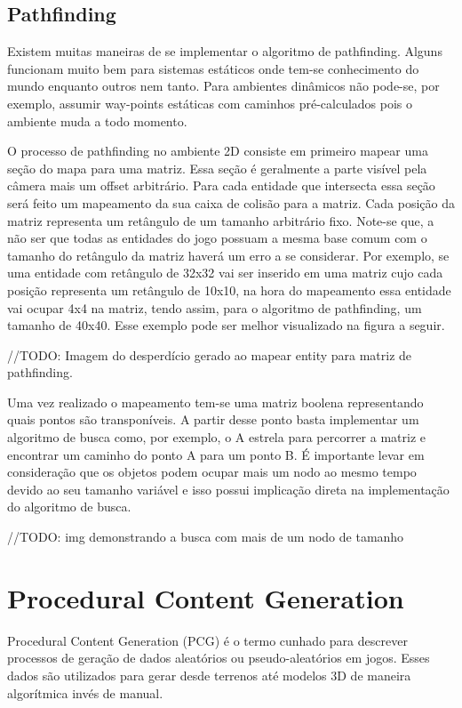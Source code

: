 \documentclass[12pt, 
openright, 
oneside, 
a4paper,    
brazil]{facom-ufu-abntex2}
\begin{document}
\section{Pathfinding}
Existem muitas maneiras de se implementar o algoritmo de pathfinding. Alguns funcionam muito bem para sistemas estáticos onde tem-se conhecimento do mundo enquanto outros nem tanto. Para ambientes dinâmicos não pode-se, por exemplo, assumir way-points estáticas com caminhos pré-calculados pois o ambiente muda a todo momento.

O processo de pathfinding no ambiente 2D consiste em primeiro mapear uma seção do mapa para uma matriz. Essa seção é geralmente a parte visível pela câmera mais um offset arbitrário. Para cada entidade que intersecta essa seção será feito um mapeamento da sua caixa de colisão para a matriz. Cada posição da matriz representa um retângulo de um tamanho arbitrário fixo. Note-se que, a não ser que todas as entidades do jogo possuam a mesma base comum com o tamanho do retângulo da matriz haverá um erro a se considerar. Por exemplo, se uma entidade com retângulo de 32x32 vai ser inserido em uma matriz cujo cada posição representa um retângulo de 10x10, na hora do mapeamento essa entidade vai ocupar 4x4 na matriz, tendo assim, para o algoritmo de pathfinding, um tamanho de 40x40. Esse exemplo pode ser melhor visualizado na figura a seguir.

//TODO: Imagem do desperdício gerado ao mapear entity para matriz de pathfinding.

Uma vez realizado o mapeamento tem-se uma matriz boolena representando quais pontos são transponíveis. A partir desse ponto basta implementar um algoritmo de busca como, por exemplo, o A estrela para percorrer a matriz e encontrar um caminho do ponto A para um ponto B. É importante levar em consideração que os objetos podem ocupar mais um nodo ao mesmo tempo devido ao seu tamanho variável e isso possui implicação direta na implementação do algoritmo de busca.

//TODO: img demonstrando a busca com mais de um nodo de tamanho

\chapter{Procedural Content Generation}
Procedural Content Generation (PCG) é o termo cunhado para descrever processos de geração de dados aleatórios ou pseudo-aleatórios em jogos. Esses dados são utilizados para gerar desde terrenos até modelos 3D de maneira algorítmica invés de manual.
\end{document}
